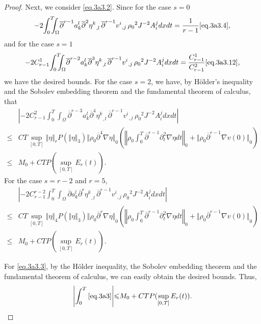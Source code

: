 \documentclass[12pt,twoside,reqno]{amsart}
\numberwithin{equation}{section}
\theoremstyle{definition}
\theoremstyle{remark}
\begin{document}
\begin{proof}
Next, we consider \eqref{eq.3a3.2}. Since for the case $s=0$
\begin{align*}
  -2{\int_0^T\!\!\!\!\int_\Omega }{\overline{\partial}}^{r-1} a_k^l{\overline{\partial}}^{2} {{{\eta^k}}_{,{l}}\,}{{{{\overline{\partial}}^{r-1} v^i}}_{,{j}}\,}{\rho_0}^2 J^{-2}A^j_idxdt=\frac{1}{r-1}\eqref{eq.3a3.4},
\end{align*}
and for the case $s=1$
\begin{align*}
  -2C_{r-1}^1{\int_0^T\!\!\!\!\int_\Omega }{\overline{\partial}}^{r-2} a_k^l{\overline{\partial}}^{3} {{{\eta^k}}_{,{l}}\,}{{{{\overline{\partial}}^{r-1} v^i}}_{,{j}}\,}{\rho_0}^2 J^{-2}A^j_idxdt=\frac{C_{r-1}^1}{C_{r-1}^2}\eqref{eq.3a3.12},
\end{align*}
we have the desired bounds. For the case $s=2$, we have, by H\"older's inequality and the Sobolev embedding theorem and the fundamental theorem of calculus, that
\begin{align*}
  &{\left\vert{-2C_{r-1}^2{\int_0^T\!\!\!\!\int_\Omega }{\overline{\partial}}^{r-3}  a_k^l{\overline{\partial}}^{4} {{{\eta^k}}_{,{l}}\,}{{{{\overline{\partial}}^{r-1} v^i}}_{,{j}}\,}{\rho_0}^2 J^{-2}A^j_idxdt}\right\vert}\\
  {\leqslant}&CT\sup_{[0,T]}{\Vert{\eta}\Vert}_rP({\Vert{\eta}\Vert}_3){\Vert{{\rho_0} {\overline{\partial}}^4{\nabla}\eta}\Vert}_0 \left({\left\Vert{{\rho_0} \int_0^T{\overline{\partial}}^{r-1}{\partial}_t^2{\nabla} \eta dt}\right\Vert}_0+{\Vert{{\rho_0} {\overline{\partial}}^{r-1}{\nabla} v(0)}\Vert}_0\right)\\
  {\leqslant}& M_0+CTP(\sup_{[0,T]}E_r(t)).
\end{align*}
For the case $s=r-2$ and $r=5$,
\begin{align*}
  &{\left\vert{-2 C_{r-1}^{r-2}{\int_0^T\!\!\!\!\int_\Omega }{\overline{\partial}}  a_k^l{\overline{\partial}}^{r} {{{\eta^k}}_{,{l}}\,}{{{{\overline{\partial}}^{r-1} v^i}}_{,{j}}\,}{\rho_0}^2 J^{-2}A^j_idxdt}\right\vert}\\
  {\leqslant}&CT\sup_{[0,T]}{\Vert{\eta}\Vert}_4P({\Vert{\eta}\Vert}_3){\Vert{{\rho_0} {\overline{\partial}}^r{\nabla}\eta}\Vert}_0 \left({\left\Vert{{\rho_0} \int_0^T{\overline{\partial}}^{r-1}{\partial}_t^2{\nabla} \eta dt}\right\Vert}_0+{\Vert{{\rho_0} {\overline{\partial}}^{r-1}{\nabla} v(0)}\Vert}_0\right)\\
  {\leqslant}& M_0+CTP(\sup_{[0,T]}E_r(t)).
\end{align*}

For \eqref{eq.3a3.3},  by the H\"older inequality, the Sobolev embedding theorem and the fundamental theorem of calculus, we can easily obtain the desired bounds. Thus,
\begin{align*}
  {\left\vert{\int_0^T\eqref{eq.3a3}}\right\vert}{\leqslant} M_0+CTP(\sup_{[0,T]}E_r(t)).
\end{align*}


\end{proof}
\end{document}
